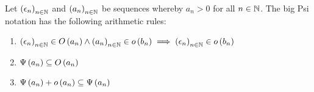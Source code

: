 \begin{theorem} \label{thm:bigpsi:rules}
  Let $\left({\epsilon_n}\right)_{{n}\in\mathbb N}$ and $\left({a_n}\right)_{{n}\in\mathbb N}$ be sequences whereby $a_n > 0$ for all $n\in\mathbb N$. The big Psi notation has the following arithmetic rules:

  \begin{enumerate}
    \item $\left({\epsilon_n}\right)_{{n}\in\mathbb N} \in O\left( {a_n} \right) \land \left({a_n}\right)_{{n}\in\mathbb N} \in o\left( {b_n} \right) \implies \left({\epsilon_n}\right)_{{n}\in\mathbb N} \in o\left( {b_n} \right)$
    \item $\Psi\left( {a_n} \right) \subseteq O\left( {a_n} \right)$
    \item $\Psi\left( {a_n} \right) + o\left( {a_n} \right) \subseteq \Psi\left( {a_n} \right)$
  \end{enumerate}
\end{theorem}
